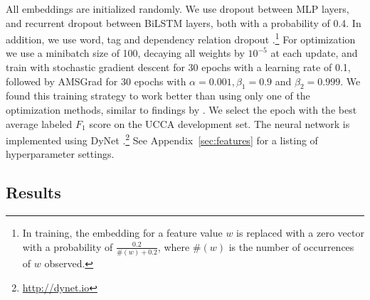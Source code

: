 \documentclass[11pt,a4paper]{article}
\newcommand{\oa}[1]{\footnote{\color{red}OA: #1}}
\DeclareMathOperator*{\argmax}{argmax}
\begin{document}
All embeddings are initialized randomly.
We use dropout \cite{srivastava2014dropout} between MLP layers, and recurrent dropout
\cite{NIPS2016_6241} between BiLSTM layers, both with a probability of 0.4.
In addition, we use word, tag and dependency relation dropout \cite{kiperwasser2016simple}.\footnote{In
training, the embedding for a feature value $w$ is replaced with a zero vector
with a probability of $\frac{0.2}{\#(w)+0.2}$, where $\#(w)$ is the number of occurrences of
$w$ observed.}
For optimization we use a minibatch size of 100, decaying all weights by $10^{-5}$ at each update,
and train with stochastic gradient descent for 30 epochs with a learning
rate of 0.1, followed by AMSGrad \cite{j.2018on} for 30 epochs with
$\alpha=0.001,\beta_1=0.9$ and $\beta_2=0.999$.
We found this training strategy to work better than using only one of the optimization methods,
similar to findings by \citet{keskar2017improving}.
We select the epoch with the best average labeled $F_1$ score on the UCCA development set.
The neural network is implemented using DyNet \cite{neubig2017dynet}.\footnote{\url{http://dynet.io}}
See Appendix~\ref{sec:features} for a listing of hyperparameter settings.

%
%



\subsection{Results}\label{sec:results}
\end{document}
